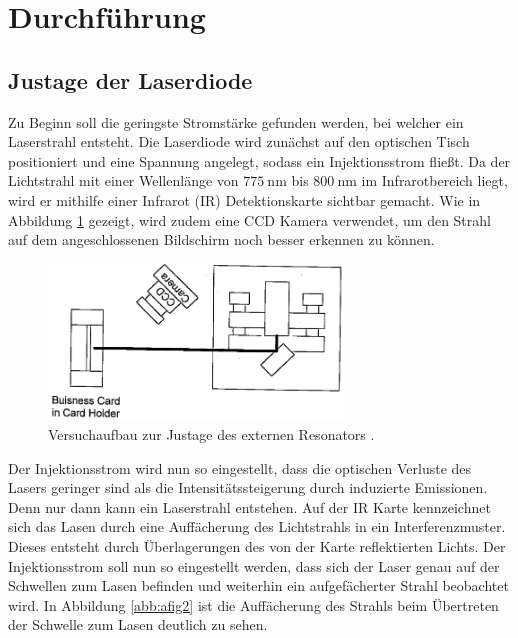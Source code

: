 \section{Durchführung}
\label{sec:Durchführung}

\subsection{Justage der Laserdiode}
Zu Beginn soll die geringste Stromstärke gefunden werden, bei welcher ein Laserstrahl entsteht.
Die Laserdiode wird zunächst auf den optischen Tisch positioniert und eine Spannung angelegt, sodass ein Injektionsstrom fließt.
Da der Lichtstrahl mit einer Wellenlänge von $\SI{775}{\nm}$ bis $\SI{800}{\nm}$ \cite{sanyo} im Infrarotbereich liegt, wird er mithilfe einer Infrarot (IR) Detektionskarte sichtbar gemacht.
Wie in Abbildung \ref{abb:afig1} gezeigt, wird zudem eine CCD Kamera verwendet, um den Strahl auf dem angeschlossenen Bildschirm noch besser erkennen zu können.

\begin{figure}
    \centering
    \includegraphics[width=0.7\textwidth]{pics/aufbau1}
    \caption{Versuchaufbau zur Justage des externen Resonators \cite{anleitung}. }
    \label{abb:afig1}
\end{figure}

Der Injektionsstrom wird nun so eingestellt, dass die optischen Verluste des Lasers geringer sind als die Intensitätssteigerung durch induzierte Emissionen.
Denn nur dann kann ein Laserstrahl entstehen.
Auf der IR Karte kennzeichnet sich das Lasen durch eine Auffächerung des Lichtstrahls in ein Interferenzmuster.
Dieses entsteht durch Überlagerungen des von der Karte reflektierten Lichts.
Der Injektionsstrom soll nun so eingestellt werden, dass sich der Laser genau auf der Schwellen zum Lasen befinden und weiterhin ein aufgefächerter Strahl beobachtet wird.
In Abbildung \ref{abb:afig2} ist die Auffächerung des Strahls beim Übertreten der Schwelle zum Lasen deutlich zu sehen.

